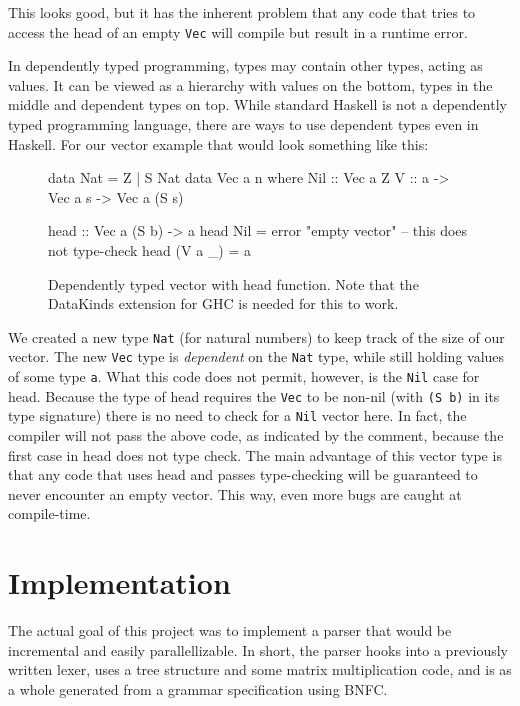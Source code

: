 \documentclass[a4paper,12pt,twosided]{report}
\begin{document}
This looks good, but it has the inherent problem that any code that tries to
access the head of an empty \texttt{Vec} will compile but result in a runtime error. 

In dependently typed programming, types may contain other types, acting as
values. It can be viewed as a hierarchy with values on the bottom, types in the
middle and dependent types on top. While standard Haskell is not a dependently
typed programming language, there are ways to use dependent types even in
Haskell. For our vector example that would look something like this:

\begin{figure}[H]
\begin{code}
data Nat = Z | S Nat
data Vec a n where
    Nil :: Vec a Z
    V :: a -> Vec a s -> Vec a (S s)

head :: Vec a (S b) -> a
head Nil = error "empty vector" -- this does not type-check
head (V a _) = a
\end{code}
\caption{Dependently typed vector with head function. Note that the DataKinds
extension for GHC is needed for this to work.}
\end{figure}

We created a new type \texttt{Nat} (for natural numbers) to keep track of the
size of our vector. The new \texttt{Vec} type is \textit{dependent} on the
\texttt{Nat} type, while still holding values of some type \texttt{a}. What this
code does not permit, however, is the \texttt{Nil} case for head. Because the
type of head requires the \texttt{Vec} to be non-nil (with \texttt{(S b)} in its
type signature) there is no need to check for a \texttt{Nil} vector here. In
fact, the compiler will not pass the above code, as indicated by the comment,
because the first case in head does not type check. The main advantage of this
vector type is that any code that uses head and passes type-checking will be
guaranteed to never encounter an empty vector.  This way, even more bugs are
caught at compile-time.

%
%

\chapter{Implementation}
The actual goal of this project was to implement a parser that would be
incremental and easily parallellizable. In short, the parser hooks into a
previously written lexer, uses a tree structure and some matrix multiplication
code, and is as a whole generated from a grammar specification using BNFC.
\end{document}
